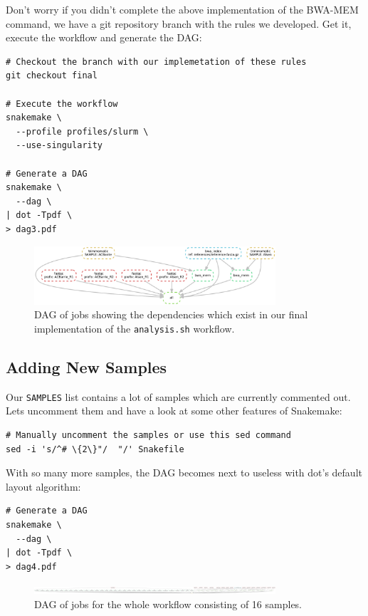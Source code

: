 Don't worry if you didn't complete the above implementation of the BWA-MEM command, we have a git repository branch with
the rules we developed. Get it, execute the workflow and generate the DAG:

\begin{lstlisting}
# Checkout the branch with our implemetation of these rules
git checkout final

# Execute the workflow
snakemake \
  --profile profiles/slurm \
  --use-singularity

# Generate a DAG
snakemake \
  --dag \
| dot -Tpdf \
> dag3.pdf
\end{lstlisting}

\begin{figure}[H]
\centering
\includegraphics[width=0.8\textwidth]{handout/dag3.pdf}
\caption{DAG of jobs showing the dependencies which exist in our final implementation of the \texttt{analysis.sh} workflow.}
\label{fig:dag3}
\end{figure}

\subsection{Adding New Samples}

Our \texttt{SAMPLES} list contains a lot of samples which are currently commented out. Lets uncomment them and have a look
at some other features of Snakemake:

\begin{lstlisting}
# Manually uncomment the samples or use this sed command
sed -i 's/^# \{2\}"/  "/' Snakefile
\end{lstlisting}

With so many more samples, the DAG becomes next to useless with dot's default layout algorithm:

\begin{lstlisting}
# Generate a DAG
snakemake \
  --dag \
| dot -Tpdf \
> dag4.pdf
\end{lstlisting}

\begin{figure}[H]
\centering
\includegraphics[width=0.8\textwidth]{handout/dag4.pdf}
\caption{DAG of jobs for the whole workflow consisting of 16 samples.}
\label{fig:dag4}
\end{figure}

